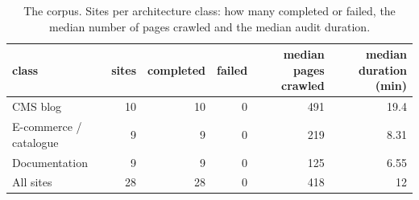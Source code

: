 \begin{table}[t]
\centering
\small
\caption{The corpus. Sites per architecture class: how many completed or failed, the median number of pages crawled and the median audit duration.}
\label{tab:t0_corpus_sites}
\begin{tabular}{lrrrrr}
\toprule
class & sites & completed & failed & median pages crawled & median duration (min) \\
\midrule
CMS blog & 10 & 10 & 0 & 491 & 19.4 \\
E-commerce / catalogue & 9 & 9 & 0 & 219 & 8.31 \\
Documentation & 9 & 9 & 0 & 125 & 6.55 \\
All sites & 28 & 28 & 0 & 418 & 12 \\
\bottomrule
\end{tabular}
\end{table}
